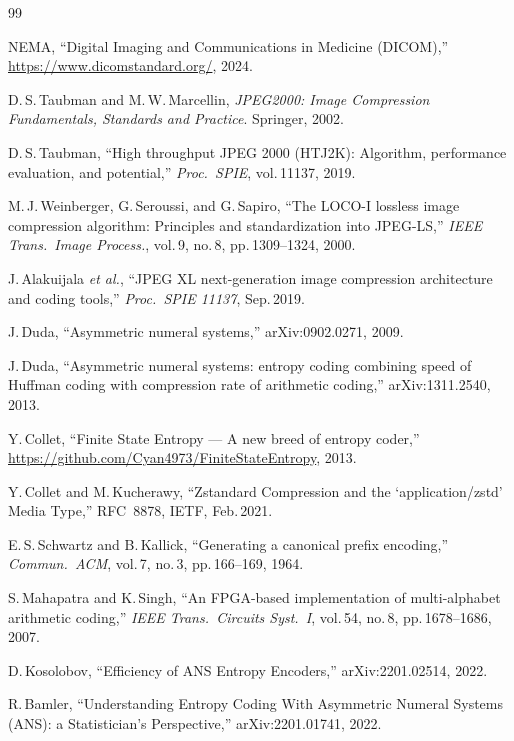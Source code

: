 \documentclass[10pt,twocolumn]{article}
\begin{document}
\balance
\begin{thebibliography}{99}

NEMA, ``Digital Imaging and Communications in Medicine (DICOM),''
\url{https://www.dicomstandard.org/}, 2024.

D.\,S.\,Taubman and M.\,W.\,Marcellin,
\textit{JPEG2000: Image Compression Fundamentals, Standards and Practice}.
Springer, 2002.

D.\,S.\,Taubman, ``High throughput JPEG 2000 (HTJ2K): Algorithm, performance
evaluation, and potential,'' \textit{Proc.\ SPIE}, vol.\,11137, 2019.

M.\,J.\,Weinberger, G.\,Seroussi, and G.\,Sapiro,
``The LOCO-I lossless image compression algorithm: Principles and
standardization into JPEG-LS,''
\textit{IEEE Trans.\ Image Process.}, vol.\,9, no.\,8, pp.\,1309--1324, 2000.

J.\,Alakuijala \textit{et al.},
``JPEG XL next-generation image compression architecture and coding tools,''
\textit{Proc.\ SPIE 11137}, Sep.\,2019.

J.\,Duda, ``Asymmetric numeral systems,'' arXiv:0902.0271, 2009.

J.\,Duda, ``Asymmetric numeral systems: entropy coding combining speed of
Huffman coding with compression rate of arithmetic coding,''
arXiv:1311.2540, 2013.

Y.\,Collet, ``Finite State Entropy --- A new breed of entropy coder,''
\url{https://github.com/Cyan4973/FiniteStateEntropy}, 2013.

Y.\,Collet and M.\,Kucherawy,
``Zstandard Compression and the `application/zstd' Media Type,''
RFC~8878, IETF, Feb.\,2021.

E.\,S.\,Schwartz and B.\,Kallick,
``Generating a canonical prefix encoding,''
\textit{Commun.\ ACM}, vol.\,7, no.\,3, pp.\,166--169, 1964.

S.\,Mahapatra and K.\,Singh,
``An FPGA-based implementation of multi-alphabet arithmetic coding,''
\textit{IEEE Trans.\ Circuits Syst.\ I}, vol.\,54, no.\,8, pp.\,1678--1686, 2007.

D.\,Kosolobov, ``Efficiency of ANS Entropy Encoders,''
arXiv:2201.02514, 2022.

R.\,Bamler, ``Understanding Entropy Coding With Asymmetric Numeral Systems
(ANS): a Statistician's Perspective,'' arXiv:2201.01741, 2022.


\end{thebibliography}
\end{document}
